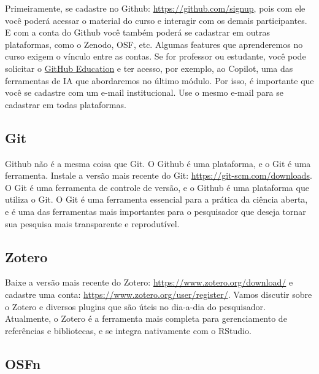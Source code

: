 \documentclass[
  a4paper,
]{article}
\begin{document}

Primeiramente, se cadastre no Github: \url{https://github.com/signup},
pois com ele você poderá acessar o material do curso e interagir com os
demais participantes. E com a conta do Github você também poderá se
cadastrar em outras plataformas, como o Zenodo, OSF, etc. Algumas
features que aprenderemos no curso exigem o vínculo entre as contas. Se
for professor ou estudante, você pode solicitar o
\href{https://education.github.com/}{GitHub Education} e ter acesso, por
exemplo, ao Copilot, uma das ferramentas de IA que abordaremos no último
módulo. Por isso, é importante que você se cadastre com um e-mail
institucional. Use o mesmo e-mail para se cadastrar em todas
plataformas.

\subsection*{Git}\label{sec-gitprework}


Github não é a mesma coisa que Git. O Github é uma plataforma, e o Git é
uma ferramenta. Instale a versão mais recente do Git:
\url{https://git-scm.com/downloads}. O Git é uma ferramenta de controle
de versão, e o Github é uma plataforma que utiliza o Git. O Git é uma
ferramenta essencial para a prática da ciência aberta, e é uma das
ferramentas mais importantes para o pesquisador que deseja tornar sua
pesquisa mais transparente e reprodutível.

\subsection*{Zotero}\label{sec-zoteroprework}


Baixe a versão mais recente do Zotero:
\url{https://www.zotero.org/download/} e cadastre uma conta:
\url{https://www.zotero.org/user/register/}. Vamos discutir sobre o
Zotero e diversos plugins que são úteis no dia-a-dia do pesquisador.
Atualmente, o Zotero é a ferramenta mais completa para gerenciamento de
referências e bibliotecas, e se integra nativamente com o RStudio.

\subsection*{OSFn}\label{sec-osfprework}
\end{document}

